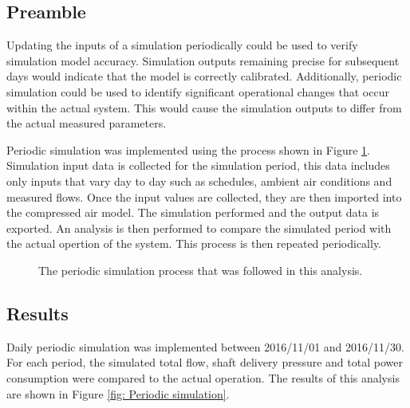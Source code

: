 	\subsection{Preamble}
	Updating the inputs of a simulation periodically could be used to verify simulation model accuracy. Simulation outputs remaining precise for subsequent days would indicate that the model is correctly calibrated. Additionally, periodic simulation could be used to identify significant operational changes that occur within the actual system. This would cause the simulation outputs to differ from the actual measured parameters. 
	\par 
	Periodic simulation was implemented using the process shown in Figure \ref{fig: PeriodicProcess}. Simulation input data is collected for the simulation period, this data includes only inputs that vary day to day such as schedules, ambient air conditions and  measured flows. Once the input values are collected, they are then imported into the compressed air model. The simulation performed and the output data is exported. An analysis is then performed to compare the simulated period with the actual opertion of the system. This process is then repeated periodically.
		\begin{figure}[h]
		\centering
		\caption{The periodic simulation process that was followed in this analysis.}
		\label{fig: PeriodicProcess}
	\end{figure}	
	     \subsection{Results}
	     Daily periodic simulation was implemented between 2016/11/01 and 2016/11/30. For each period, the simulated total flow, shaft delivery pressure and total power consumption were compared to the actual operation. The results of this analysis are shown in Figure \ref{fig: Periodic simulation}.
	     \par 
	     
